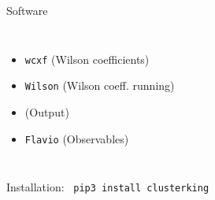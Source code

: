 \begin{frame}{Software}
\begin{columns}
\begin{itemize}
            \item {} \texttt{wcxf} {\footnotesize(Wilson coefficients)}
            \item {} \texttt{Wilson} {\footnotesize(Wilson coeff. running)}
            \item 
             {\footnotesize (Output)}
            \item {} \texttt{Flavio} {\footnotesize(Observables)}
        \end{itemize}
     \end{columns}
     
     \vspace{0.3cm}
     \begin{center}
         Installation: \ {\color{purple}\texttt{pip3 install clusterking}}
    \end{center}
\end{frame}

